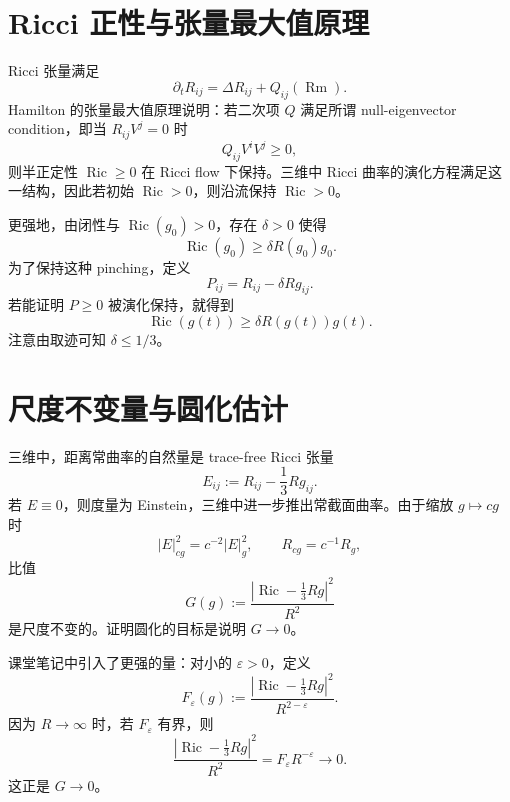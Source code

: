 \documentclass[11pt,a4paper,cn,nofont,math=cm,mode=fancy,bibtex]{elegantbook}
\numberwithin{equation}{chapter}
\numberwithin{figure}{chapter}
\newcommand{\Ric}{\operatorname{Ric}}
\newcommand{\Rm}{\operatorname{Rm}}
\newcommand{\norm}[1]{\left\lvert #1\right\rvert}
\begin{document}
\section{Ricci 正性与张量最大值原理}

Ricci 张量满足
\begin{equation}\label{eq:Ric-evol-Q}
  \partial_t R_{ij}=\Delta R_{ij}+Q_{ij}(\Rm).
\end{equation}
Hamilton 的张量最大值原理说明：若二次项 $Q$ 满足所谓 null-eigenvector condition，即当 $R_{ij}V^j=0$ 时
\[
  Q_{ij}V^iV^j\ge0,
\]
则半正定性 $\Ric\ge0$ 在 Ricci flow 下保持。三维中 Ricci 曲率的演化方程满足这一结构，因此若初始 $\Ric>0$，则沿流保持 $\Ric>0$。

更强地，由闭性与 $\Ric(g_0)>0$，存在 $\delta>0$ 使得
\begin{equation}\label{eq:pinching}
  \Ric(g_0)\ge \delta R(g_0)g_0.
\end{equation}
为了保持这种 pinching，定义
\[
  P_{ij}=R_{ij}-\delta R g_{ij}.
\]
若能证明 $P\ge0$ 被演化保持，就得到
\[
  \Ric(g(t))\ge \delta R(g(t))g(t).
\]
注意由取迹可知 $\delta\le1/3$。

\section{尺度不变量与圆化估计}

三维中，距离常曲率的自然量是 trace-free Ricci 张量
\[
  E_{ij}:=R_{ij}-\frac13 Rg_{ij}.
\]
若 $E\equiv0$，则度量为 Einstein，三维中进一步推出常截面曲率。由于缩放 $g\mapsto cg$ 时
\[
  \norm{E}_{cg}^2=c^{-2}\norm{E}_g^2,
  \qquad R_{cg}=c^{-1}R_g,
\]
比值
\begin{equation}\label{eq:G-scale-invariant}
  G(g):=\frac{\norm{\Ric-\frac13Rg}^2}{R^2}
\end{equation}
是尺度不变的。证明圆化的目标是说明 $G\to0$。

课堂笔记中引入了更强的量：对小的 $\varepsilon>0$，定义
\begin{equation}\label{eq:Eepsilon}
  F_\varepsilon(g):=\frac{\norm{\Ric-\frac13Rg}^2}{R^{2-\varepsilon}}.
\end{equation}
因为 $R\to\infty$ 时，若 $F_\varepsilon$ 有界，则
\[
  \frac{\norm{\Ric-\frac13Rg}^2}{R^2}
  =F_\varepsilon R^{-\varepsilon}\to0.
\]
这正是 $G\to0$。
\end{document}
